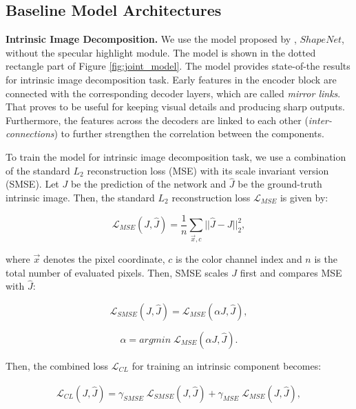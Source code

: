 \documentclass[runningheads]{llncs}
\begin{document}
\subsection{Baseline Model Architectures}
\textbf{Intrinsic Image Decomposition.}  We use the model proposed by \cite{shi}, $ShapeNet$, without the specular highlight module. The model is shown in the dotted rectangle part of Figure \ref{fig:joint_model}. The model provides state-of-the results for intrinsic image decomposition task. Early features in the encoder block are connected with the corresponding decoder layers, which are called \textit{mirror links}. That proves to be useful for keeping visual details and producing sharp outputs. Furthermore, the features across the decoders are linked to each other (\textit{inter-connections}) to further strengthen the correlation between the components.

To train the model for intrinsic image decomposition task, we use a combination of the standard $L_2$ reconstruction loss (MSE) with its scale invariant version (SMSE). Let $J$ be the prediction of the network and $\hat{J}$ be the ground-truth intrinsic image. Then, the standard $L_2$ reconstruction loss $\mathcal{L}_{MSE}$ is given by:

\begin{equation} \label{eq:MSE}
\mathcal{L}_{MSE}(J, \hat{J}) = \frac{1}{n} \sum_{\vec{x},c}^{} ||\hat{J} - J||^{2}_{2},
\end{equation}

\noindent where $\vec{x}$ denotes the pixel coordinate, $c$ is the color channel index and $n$ is the total number of evaluated pixels. Then, SMSE scales $J$ first and compares MSE with $\hat{J}$:

\begin{equation} \label{eq:SMSE}
\mathcal{L}_{SMSE}(J, \hat{J}) = \mathcal{L}_{MSE}(\alpha J, \hat{J}),
\end{equation}

\begin{equation} \label{eq:alpha}
\alpha =  argmin \; \mathcal{L}_{MSE}(\alpha J, \hat{J}).
\end{equation}

\noindent Then, the combined loss $\mathcal{L}_{CL}$ for training an intrinsic component becomes:

\begin{equation} \label{eq:CL}
\begin{aligned}
\mathcal{L}_{CL}(J, \hat{J}) = \gamma_{SMSE} \; \mathcal{L}_{SMSE}(J, \hat{J}) + \gamma_{MSE} \; \mathcal{L}_{MSE}(J, \hat{J}),
\end{aligned}
\end{equation}
\end{document}
